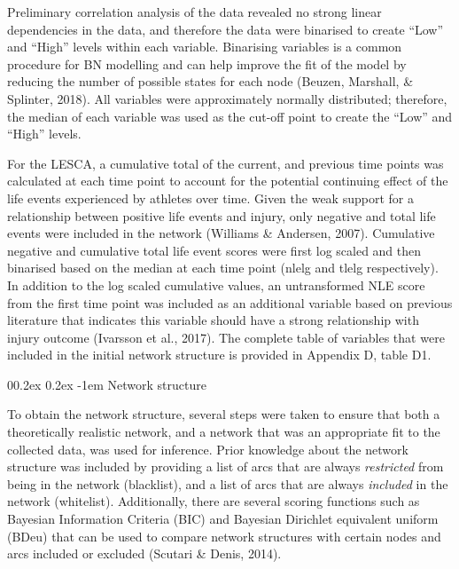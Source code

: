 \documentclass[
  english,
  man,floatsintext]{apa6}
\makeatletter
\renewcommand{\paragraph}{\@startsection{paragraph}{4}{\parindent}%
  {0\baselineskip \@plus 0.2ex \@minus 0.2ex}%
  {-1em}%
  {\normalfont\normalsize\bfseries\itshape\typesectitle}}
\makeatother
\begin{document}
Preliminary correlation analysis of the data revealed no strong linear dependencies in the data, and therefore the data were binarised to create \enquote{Low} and \enquote{High} levels within each variable.
Binarising variables is a common procedure for BN modelling and can help improve the fit of the model by reducing the number of possible states for each node (Beuzen, Marshall, \& Splinter, 2018).
All variables were approximately normally distributed; therefore, the median of each variable was used as the cut-off point to create the \enquote{Low} and \enquote{High} levels.

For the LESCA, a cumulative total of the current, and previous time points was calculated at each time point to account for the potential continuing effect of the life events experienced by athletes over time.
Given the weak support for a relationship between positive life events and injury, only negative and total life events were included in the network (Williams \& Andersen, 2007).
Cumulative negative and cumulative total life event scores were first log scaled and then binarised based on the median at each time point (nlelg and tlelg respectively).
In addition to the log scaled cumulative values, an untransformed NLE score from the first time point was included as an additional variable based on previous literature that indicates this variable should have a strong relationship with injury outcome (Ivarsson et al., 2017).
The complete table of variables that were included in the initial network structure is provided in Appendix D, table D1.

\hypertarget{network-structure}{%
\paragraph{Network structure}\label{network-structure}}

To obtain the network structure, several steps were taken to ensure that both a theoretically realistic network, and a network that was an appropriate fit to the collected data, was used for inference.
Prior knowledge about the network structure was included by providing a list of arcs that are always \emph{restricted} from being in the network (blacklist), and a list of arcs that are always \emph{included} in the network (whitelist).
Additionally, there are several scoring functions such as Bayesian Information Criteria (BIC) and Bayesian Dirichlet equivalent uniform (BDeu) that can be used to compare network structures with certain nodes and arcs included or excluded (Scutari \& Denis, 2014).
\end{document}
